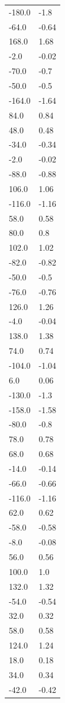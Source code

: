 \begin{longtable}{ll}
-180.0 & -1.8 \\
-64.0 & -0.64 \\
168.0 & 1.68 \\
-2.0 & -0.02 \\
-70.0 & -0.7 \\
-50.0 & -0.5 \\
-164.0 & -1.64 \\
84.0 & 0.84 \\
48.0 & 0.48 \\
-34.0 & -0.34 \\
-2.0 & -0.02 \\
-88.0 & -0.88 \\
106.0 & 1.06 \\
-116.0 & -1.16 \\
58.0 & 0.58 \\
80.0 & 0.8 \\
102.0 & 1.02 \\
-82.0 & -0.82 \\
-50.0 & -0.5 \\
-76.0 & -0.76 \\
126.0 & 1.26 \\
-4.0 & -0.04 \\
138.0 & 1.38 \\
74.0 & 0.74 \\
-104.0 & -1.04 \\
6.0 & 0.06 \\
-130.0 & -1.3 \\
-158.0 & -1.58 \\
-80.0 & -0.8 \\
78.0 & 0.78 \\
68.0 & 0.68 \\
-14.0 & -0.14 \\
-66.0 & -0.66 \\
-116.0 & -1.16 \\
62.0 & 0.62 \\
-58.0 & -0.58 \\
-8.0 & -0.08 \\
56.0 & 0.56 \\
100.0 & 1.0 \\
132.0 & 1.32 \\
-54.0 & -0.54 \\
32.0 & 0.32 \\
58.0 & 0.58 \\
124.0 & 1.24 \\
18.0 & 0.18 \\
34.0 & 0.34 \\
-42.0 & -0.42 \\

\end{longtable}
